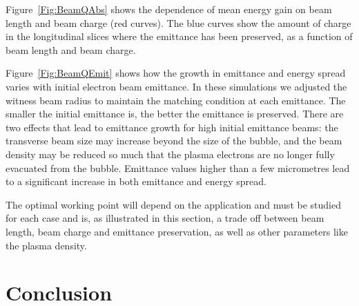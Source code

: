 \documentclass[aps,prstab,reprint,amsmath,amssymb,groupedaddress]{revtex4-1}
\begin{document}
Figure~\ref{Fig:BeamQAbs} shows the dependence of mean energy gain on beam length and beam charge (red curves). The blue
curves show the amount of charge in the longitudinal slices where the emittance has been preserved, as a function of
beam length and beam charge.

Figure~\ref{Fig:BeamQEmit} shows how the growth in emittance and energy spread varies with initial electron beam
emittance. In these simulations we adjusted the witness beam radius to maintain the matching condition at each
emittance. The smaller the initial emittance is, the better the emittance is preserved. There are two effects that lead
to emittance growth for high initial emittance beams: the transverse beam size may increase beyond the size of the
bubble, and the beam density may be reduced so much that the plasma electrons are no longer fully evacuated from the
bubble. Emittance values higher than a few micrometres lead to a significant increase in both emittance and energy
spread. 

The optimal working point will depend on the application and must be studied for each case and is, as illustrated in
this section, a trade off between beam length, beam charge and emittance preservation, as well as other parameters
like the plasma density.   

\section{Conclusion}\label{S:C}

\end{document}
